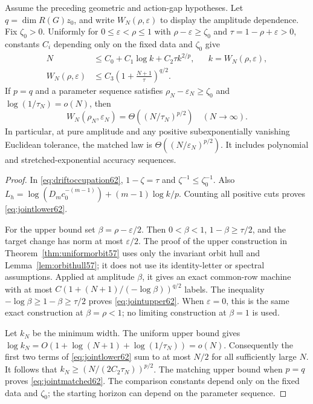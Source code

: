 \begin{theorem}\label{thm:jointlaw62}
Assume the preceding geometric and action-gap hypotheses. Let
$q=\dim R(G)z_0$, and write $W_N(\rho,\varepsilon)$ to display the
amplitude dependence. Fix $\zeta_0>0$. Uniformly for
$0\le\varepsilon<\rho\le1$ with $\rho-\varepsilon\ge\zeta_0$ and
$\tau=1-\rho+\varepsilon>0$, constants $C_i$ depending only on the
fixed data and $\zeta_0$ give
\begin{align}
 N&\le C_0+C_1\log k+C_2\tau k^{2/p},
                       &&k=W_N(\rho,\varepsilon),\label{eq:jointlower62}\\
 W_N(\rho,\varepsilon)&\le C_3\left(1+\frac{N+1}{\tau}\right)^{q/2}.
                                                        \label{eq:jointupper62}
\end{align}
If $p=q$ and a parameter sequence satisfies
$\rho_N-\varepsilon_N\ge\zeta_0$ and
$\log(1/\tau_N)=o(N)$, then
\begin{equation}\label{eq:jointmatched62}
 W_N(\rho_N,\varepsilon_N)
            =\Theta\left((N/\tau_N)^{p/2}\right)\quad(N\longrightarrow\infty).
\end{equation}
In particular, at pure amplitude and any positive subexponentially
vanishing Euclidean tolerance, the matched law is
$\Theta((N/\varepsilon_N)^{p/2})$. It includes polynomial and
stretched-exponential accuracy sequences.
\end{theorem}
\begin{proof}
In \eqref{eq:driftoccupation62}, $1-\zeta=\tau$ and
$\zeta^{-1}\le\zeta_0^{-1}$. Also
$L_h=\log(D_mc_0^{-(m-1)})+(m-1)\log k/p$. Counting all positive cuts
proves \eqref{eq:jointlower62}.

For the upper bound set $\beta=\rho-\varepsilon/2$. Then
$0<\beta<1$, $1-\beta\ge\tau/2$, and the target change has norm at
most $\varepsilon/2$. The proof of the upper construction in
Theorem~\ref{thm:uniformorbit57} uses only the invariant orbit hull and
Lemma~\ref{lem:orbithull57}; it does not use its identity-letter or
spectral assumptions. Applied at amplitude $\beta$, it gives an exact
common-row machine with at most
$C(1+(N+1)/(-\log\beta))^{q/2}$ labels. The inequality
$-\log\beta\ge1-\beta\ge\tau/2$ proves \eqref{eq:jointupper62}.
When $\varepsilon=0$, this is the same exact construction at
$\beta=\rho<1$; no limiting construction at $\beta=1$ is used.

Let $k_N$ be the minimum width. The uniform upper bound gives
$\log k_N=O(1+\log(N+1)+\log(1/\tau_N))=o(N)$.
Consequently the first two terms of \eqref{eq:jointlower62} sum to at
most $N/2$ for all sufficiently large $N$. It follows that
$k_N\ge(N/(2C_2\tau_N))^{p/2}$. The matching upper bound when $p=q$
proves \eqref{eq:jointmatched62}. The comparison constants depend only
on the fixed data and $\zeta_0$; the starting horizon can depend on the
parameter sequence.
\end{proof}

